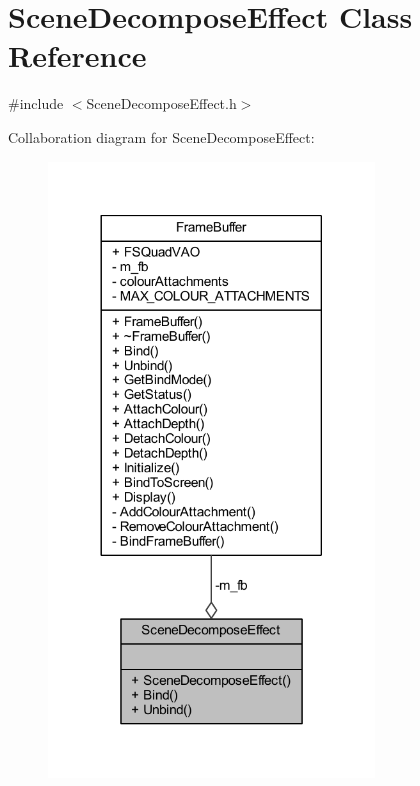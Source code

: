 \hypertarget{class_scene_decompose_effect}{}\section{Scene\+Decompose\+Effect Class Reference}
\label{class_scene_decompose_effect}


{\ttfamily \#include $<$Scene\+Decompose\+Effect.\+h$>$}



Collaboration diagram for Scene\+Decompose\+Effect\+:\nopagebreak
\begin{figure}[H]
\begin{center}
\leavevmode
\includegraphics[width=245pt]{class_scene_decompose_effect__coll__graph}
\end{center}
\end{figure}
